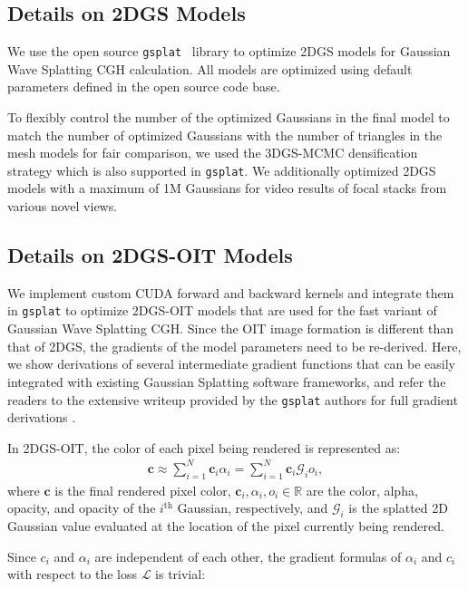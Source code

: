 \subsection{Details on 2DGS Models}
We use the open source \texttt{gsplat}~\cite{ye2024gsplat} library to optimize 2DGS models for Gaussian Wave Splatting CGH calculation. All models are optimized using default parameters defined in the open source code base.

To flexibly control the number of the optimized Gaussians in the final model to match the number of optimized Gaussians with the number of triangles in the mesh models for fair comparison, we used the 3DGS-MCMC densification strategy \cite{kheradmand20243dgsmcmc} which is also supported in \texttt{gsplat}. We additionally optimized 2DGS models with a maximum of 1M Gaussians for video results of focal stacks from various novel views.  

\subsection{Details on 2DGS-OIT Models}
We implement custom CUDA forward and backward kernels and integrate them in \texttt{gsplat} to optimize 2DGS-OIT models that are used for the fast variant of Gaussian Wave Splatting CGH. Since the OIT image formation is different than that of 2DGS, the gradients of the model parameters need to be re-derived. Here, we show derivations of several intermediate gradient functions that can be easily integrated with existing Gaussian Splatting software frameworks, and refer the readers to the extensive writeup provided by the \texttt{gsplat} authors for full gradient derivations \cite{ye2024gsplat}.

In 2DGS-OIT, the color of each pixel being rendered  is represented as:
\begin{align}
    \mathbf{c} \approx \sum_{i=1}^N \mathbf{c}_i \alpha_i = \sum_{i=1}^N \mathbf{c}_i \mathcal{G}_i o_i,
\label{eq:OIT}
\end{align}
where $\mathbf{c}$ is the final rendered pixel color, $\mathbf{c}_i, \alpha_i, o_i \in \mathbb{R}$ are the color, alpha, opacity, and opacity of the $i^\text{th}$ Gaussian, respectively, and $\mathcal{G}_i$ is the splatted 2D Gaussian value evaluated at the location of the pixel currently being rendered. 

Since $c_i$ and $\alpha_i$ are independent of each other, the gradient formulas of $\alpha_i$ and $c_i$ with respect to the loss $\mathcal{L}$ is trivial:

